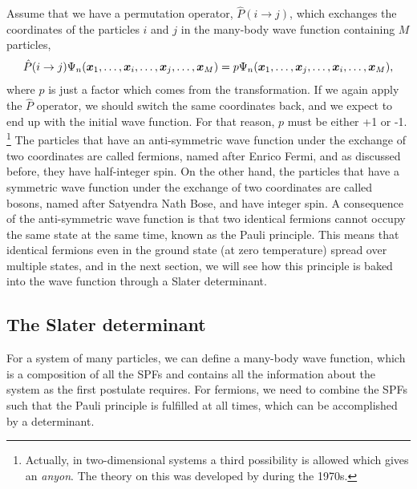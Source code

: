 Assume that we have a permutation operator, $\hat{P}(i\rightarrow j)$, which exchanges the coordinates of the particles $i$ and $j$ in the many-body wave function containing $M$ particles,
\begin{equation}
\hat{P}(i\rightarrow j)\Psi_n(\boldsymbol{{x}}_1,\hdots,\boldsymbol{{x}}_i,\hdots,\boldsymbol{{x}}_j,\hdots,\boldsymbol{{x}}_M)=p\Psi_n(\boldsymbol{{x}}_1,\hdots,\boldsymbol{{x}}_j,\hdots,\boldsymbol{{x}}_i,\hdots,\boldsymbol{{x}}_M),
\end{equation}
where $p$ is just a factor which comes from the transformation. If we again apply the $\hat{P}$ operator, we should switch the same coordinates back, and we expect to end up with the initial wave function. For that reason, $p$ must be either +1 or -1. \footnote{Actually, in two-dimensional systems a third possibility is allowed which gives an \textit{anyon}. The theory on this was developed by \citet{leinaas_one_1977} during the 1970s.} The particles that have an anti-symmetric wave function under the exchange of two coordinates are called fermions, named after Enrico Fermi, and as discussed before, they have half-integer spin. On the other hand, the particles that have a symmetric wave function under the exchange of two coordinates are called bosons, named after Satyendra Nath Bose, and have integer spin. A consequence of the anti-symmetric wave function is that two identical fermions cannot occupy the same state at the same time, known as the Pauli principle. This means that identical fermions even in the ground state (at zero temperature) spread over multiple states, and in the next section, we will see how this principle is baked into the wave function through a Slater determinant. 

\subsection{The Slater determinant} \label{sec:slater}
For a system of many particles, we can define a many-body wave function, which is a composition of all the SPFs and contains all the information about the system as the first postulate requires. For fermions, we need to combine the SPFs such that the Pauli principle is fulfilled at all times, which can be accomplished by a determinant. 


